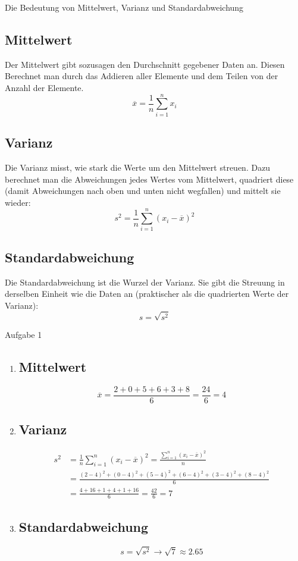 \documentclass[11pt,a4paper,oneside]{article}
\begin{document}
	\begin{theo}{Die Bedeutung von Mittelwert, Varianz und Standardabweichung}
		\subsection*{Mittelwert}
		Der Mittelwert gibt sozusagen den Durchschnitt gegebener Daten an. Diesen Berechnet man durch das Addieren aller Elemente und dem Teilen von der Anzahl der Elemente. 
		\[
		\overline{x} = \frac{1}{n} \sum^{n}_{i = 1} x_i 
		\]
		\subsection*{Varianz}
		Die Varianz misst, wie stark die Werte um den Mittelwert streuen. Dazu berechnet man die Abweichungen jedes Wertes vom Mittelwert, quadriert diese (damit Abweichungen nach oben und unten nicht wegfallen) und mittelt sie wieder:
		\[
		s^2 = \frac{1}{n} \sum^{n}_{i = 1} (x_i - \overline{x})^2 
		\]
		\subsection*{Standardabweichung}
		Die Standardabweichung ist die Wurzel der Varianz. Sie gibt die Streuung in derselben Einheit wie die Daten an (praktischer als die quadrierten Werte der Varianz):
		\[
		s = \sqrt{s^2}
		\]
	\end{theo}
	
	\begin{loesung}{Aufgabe 1}
	\begin{enumerate}
		\item \subsection*{Mittelwert}
		\vspace{-4mm}
		\[
			\overline{x} = \frac{2 + 0 + 5 + 6 + 3 + 8}{6} = \boxed{\frac{24}{6} = 4}
		\]
		\item \subsection*{Varianz}
		\vspace{-6mm}
		\begin{align*}
			s^2 &= \frac{1}{n} \sum^{n}_{i = 1} (x_i - \overline{x})^2 = \frac{\sum^{n}_{i = 1} (x_i - \overline{x})^2}{n}\\
			&= \frac{(2 - 4)^2 + (0 - 4)^2 + (5 - 4)^2 + (6 - 4)^2 + (3 - 4)^2 + (8 - 4)^2}{6}\\
			&= \frac{4 + 16 + 1 + 4 + 1 + 16}{6} = \boxed{\frac{42}{6} = 7}
		\end{align*}
	\item \subsection*{Standardabweichung} 
	\[
	s = \sqrt{s^2} \rightarrow \boxed{\sqrt{7} \approx 2.65}
	\]
	\end{enumerate}
	\end{loesung}
	
\end{document}
